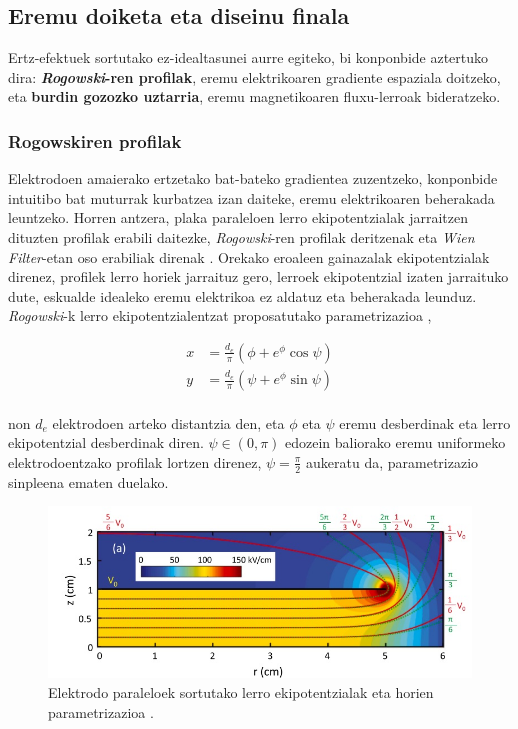 \documentclass[12pt]{article}
\numberwithin{figure}{section}
\numberwithin{equation}{section}
\begin{document}
\subsection{Eremu doiketa eta diseinu finala}
\label{sec:diseinu-finala}
Ertz-efektuek sortutako ez-idealtasunei aurre egiteko, bi konponbide aztertuko dira: \textbf{\textit{Rogowski}-ren profilak}, eremu elektrikoaren gradiente espaziala doitzeko, eta \textbf{burdin gozozko uztarria}, eremu magnetikoaren fluxu-lerroak bideratzeko.

\subsubsection{Rogowskiren profilak}

Elektrodoen amaierako ertzetako bat-bateko gradientea zuzentzeko, konponbide intuitibo bat muturrak kurbatzea izan daiteke, eremu elektrikoaren beherakada leuntzeko. Horren antzera, plaka paraleloen lerro ekipotentzialak jarraitzen dituzten profilak erabili daitezke, \textit{Rogowski}-ren profilak deritzenak \cite{rogowski_elektrische_1923} eta \textit{Wien Filter}-etan oso erabiliak direnak \cite{palacios_serrano_high_2021}. Orekako eroaleen gainazalak ekipotentzialak direnez, profilek lerro horiek jarraituz gero, lerroek ekipotentzial izaten jarraituko dute, eskualde idealeko eremu elektrikoa ez aldatuz eta beherakada leunduz.\\

\textit{Rogowski}-k lerro ekipotentzialentzat proposatutako parametrizazioa \cite{wei_designing_2021},

\begin{equation}
    \begin{aligned}
        x &= \frac{d_e}{\pi}(\phi + e^\phi \cos \psi)\\
        y &= \frac{d_e}{\pi}(\psi + e^\phi \sin \psi)
    \end{aligned}
\end{equation}
\\
non $d_e$ elektrodoen arteko distantzia den, eta $\phi$ eta $\psi$ eremu desberdinak eta lerro ekipotentzial desberdinak diren. $\psi \in (0,\pi)$ edozein baliorako eremu uniformeko elektrodoentzako profilak lortzen direnez, $\psi=\frac{\pi}{2}$ aukeratu da, parametrizazio sinpleena ematen duelako.

\begin{figure}[h]
    \centering
    \includegraphics[width=0.75\linewidth]{4 - Diseinua/lerro_ekipotentzial.jpg}
    \caption{Elektrodo paraleloek sortutako lerro ekipotentzialak eta horien parametrizazioa \cite{wei_designing_2021}.}
    \label{fig:erro_ekipotentzial}
\end{figure}
\end{document}
